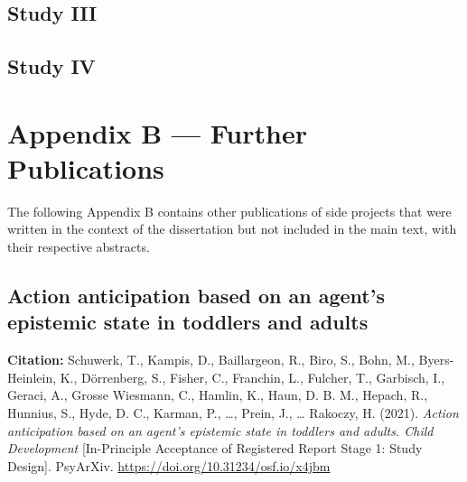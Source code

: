 \documentclass[
]{scrbook}
\begin{document}


\newpage

\section*{Study III}\label{studyIII}

\begin{minipage}{\textwidth}

\end{minipage}



\newpage

\section*{Study IV}\label{studyIV}

\begin{minipage}{\textwidth}

\end{minipage}



\chapter*{Appendix B --- Further Publications}\label{appendixB}

The following Appendix B contains other publications of side projects that were written in the context of the dissertation but not included in the main text, with their respective abstracts.

\section*{Action anticipation based on an agent's epistemic state in toddlers and adults}\label{manybabies}

\textbf{Citation:} Schuwerk, T., Kampis, D., Baillargeon, R., Biro, S., Bohn, M., Byers-Heinlein, K., Dörrenberg, S., Fisher, C., Franchin, L., Fulcher, T., Garbisch, I., Geraci, A., Grosse Wiesmann, C., Hamlin, K., Haun, D. B. M., Hepach, R., Hunnius, S., Hyde, D. C., Karman, P., \ldots, Prein, J., \ldots{} Rakoczy, H. (2021). \emph{Action anticipation based on an agent's epistemic state in toddlers and adults. Child Development} {[}In-Principle Acceptance of Registered Report Stage 1: Study Design{]}. PsyArXiv. \mbox{\url{https://doi.org/10.31234/osf.io/x4jbm}}
\end{document}
